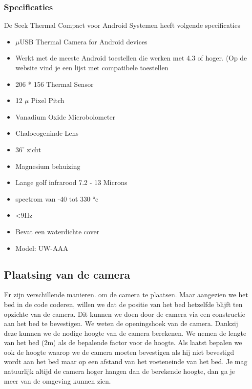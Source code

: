 \subsubsection{Specificaties}
\label{mRefSTS}
De Seek Thermal Compact voor Android Systemen heeft volgende specificaties
\begin{itemize}
	\item $\mu$USB Thermal Camera for Android devices
	\item Werkt met de meeste Android toestellen die werken met 4.3 of hoger. (Op de website vind je een lijst met compatibele toestellen \cite{bibImgSTC}
	\item 206 * 156 Thermal Sensor
	\item 12 $\mu$ Pixel Pitch
	\item Vanadium Oxide Microbolometer
	\item Chalocogeninde Lens
	\item $36^{\circ}$ zicht
	\item Magnesium behuizing
	\item Lange golf infrarood 7.2 - 13 Microns
	\item  spectrom van -40 tot 330 °c
	\item <9Hz
	\item Bevat een waterdichte cover
	\item Model: UW-AAA
\end{itemize}
\cite{bibImgSTC}

\subsection {Plaatsing van de camera}
\label{mRefSTP}
Er zijn verschillende manieren. om de camera te plaatsen. Maar aangezien we het bed in de code coderen, willen we dat de positie van het bed hetzelfde blijft ten opzichte van de camera. Dit kunnen we doen door de camera via een constructie aan het bed te bevestigen. We weten de openingshoek van de camera. Dankzij deze kunnen we de nodige hoogte van de camera berekenen. We nemen de lengte van het bed (2m) als de bepalende factor voor de hoogte. Als laatst bepalen we ook de hoogte waarop we de camera moeten bevestigen als hij niet bevestigd wordt aan het bed maar op een afstand van het voeteneinde van het bed. Je mag natuurlijk altijd de camera hoger hangen dan de berekende hoogte, dan ga je meer van de omgeving kunnen zien.

